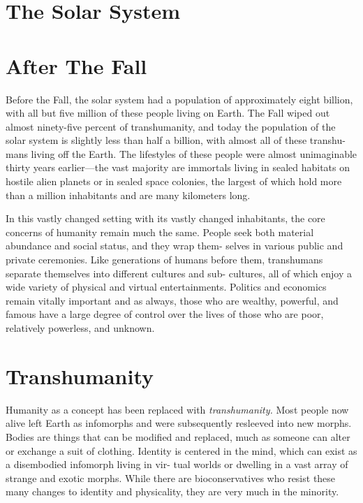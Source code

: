 \section{The Solar System }


\section{After The Fall}

Before the Fall, the solar system had a population of 
approximately eight billion, with all but five million 
of these people living on Earth. The Fall wiped out 
almost ninety-five percent of transhumanity, and 
today the population of the solar system is slightly less 
than half a billion, with almost all of these transhu-
mans living off the Earth. The lifestyles of these people 
were almost unimaginable thirty years earlier—the 
vast majority are immortals living in sealed habitats 
on hostile alien planets or in sealed space colonies, the 
largest of which hold more than a million inhabitants 
and are many kilometers long.

In this vastly changed setting with its vastly 
changed inhabitants, the core concerns of humanity 
remain much the same. People seek both material 
abundance and social status, and they wrap them-
selves in various public and private ceremonies. Like 
generations of humans before them, transhumans 
separate themselves into different cultures and sub-
cultures, all of which enjoy a wide variety of physical 
and virtual entertainments. Politics and economics 
remain vitally important and as always, those who are 
wealthy, powerful, and famous have a large degree of 
control over the lives of those who are poor, relatively 
powerless, and unknown.

\section{Transhumanity}

Humanity as a concept has been replaced with 
\textit{transhumanity.} Most people now alive left Earth as 
infomorphs and were subsequently resleeved into new 
morphs. Bodies are things that can be modified and 
replaced, much as someone can alter or exchange a 
suit of clothing. Identity is centered in the mind, which 
can exist as a disembodied infomorph living in vir-
tual worlds or dwelling in a vast array of strange and 
exotic morphs. While there are bioconservatives who 
resist these many changes to identity and physicality, 
they are very much in the minority.

